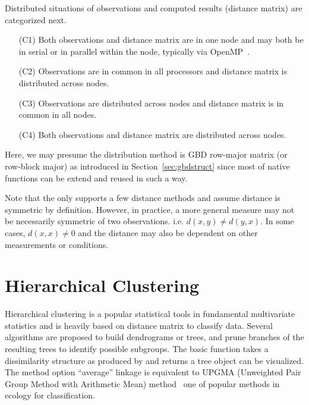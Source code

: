 Distributed situations of observations and computed results (distance
matrix) are categorized next.
\begin{itemize}
\item[(C1)]
      Both observations and distance matrix are in one node and may both be
      in serial or in parallel within the node, typically via
      OpenMP~\citep{OpenMP}.
\item[(C2)]
      Observations are in common in all processors
      and distance matrix is distributed across nodes.
\item[(C3)]
      Observations are distributed across nodes
      and distance matrix is in common in all nodes.
\item[(C4)]
      Both observations and distance matrix are distributed
      across nodes.
\end{itemize}
Here, we may presume the distribution method is GBD row-major matrix (or
row-block major) as introduced in Section~\ref{sec:gbdstruct} since most of
native  functions can be extend and reused in such a way.

Note that the  only supports a few distance methods and assume
distance is symmetric by definition. However,
in practice, a more general measure may not be necessarily
symmetric of two observations. i.e. $d(x, y) \neq d(y, x)$.
In some cases, $d(x, x) \neq 0$ and the distance may also be dependent
on other measurements or conditions.


\section{Hierarchical Clustering}

Hierarchical clustering is a popular statistical tools in fundamental
multivariate statistics and is heavily based on distance matrix to classify
data. Several algorithms are proposed to build dendrograms or trees, and
prune branches of the resulting trees to identify possible subgroups.
The basic function 
takes a dissimilarity structure as
produced by  and returns a tree object can be visualized.
The method option ``average'' linkage is equivalent to
UPGMA (Unweighted Pair Group Method with Arithmetic Mean)
method~\citep{Sokal1985} one of popular methods in ecology for classification.

